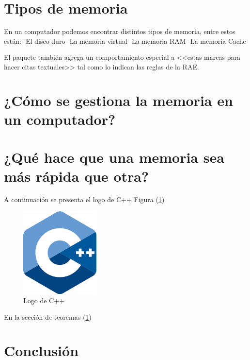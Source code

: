 \documentclass{article}
\begin{document}
\section{Tipos de memoria} \label{contenido}

En un computador podemos encontrar distintos tipos de memoria, entre estos están:
-El disco duro
-La memoria virtual
-La memoria RAM
-La memoria Cache



El paquete también agrega un comportamiento especial 
a <<estas marcas para hacer citas textuales>> tal como 
lo indican las reglas de la RAE. \cite{dirac}

\section{¿Cómo se gestiona la memoria en un computador?} 

\section{¿Qué hace que una memoria sea más rápida que otra?} 

A continuación se presenta el logo de C++ Figura (\ref{fig:cpplogo})
\begin{figure}[h]
\includegraphics[width=4cm]{cpplogo.png}
\centering
\caption{Logo de C++}
\label{fig:cpplogo}
\end{figure}

En la sección de teoremas (\ref{contenido})

\section{Conclusión} \label{conclulsion}



\end{document}

